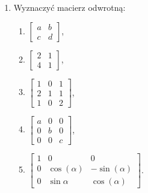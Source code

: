\documentclass{article}
\begin{document}
\begin{enumerate}
    \item Wyznaczyć macierz odwrotną:
    \begin{enumerate}
        \item $\begin{bmatrix} a & b\\ c & d \end{bmatrix}$,
        \item $\begin{bmatrix} 2 & 1\\ 4 & 1 \end{bmatrix}$,
        \item $\begin{bmatrix} 1 & 0 & 1\\ 2 & 1 & 1\\ 1 & 0 & 2 \end{bmatrix}$,
        \item $\begin{bmatrix} a & 0 & 0\\ 0 & b & 0\\ 0 & 0 & c \end{bmatrix}$,
        \item $\begin{bmatrix} 1 & 0 & 0\\ 0 & \cos(\alpha) & -\sin(\alpha)\\ 0 & \sin{\alpha} &  \cos(\alpha) \end{bmatrix}$.
    \end{enumerate}

\end{enumerate}
\end{document}
